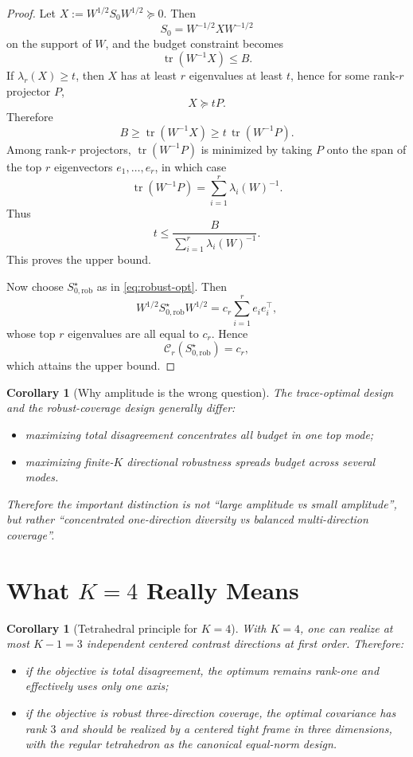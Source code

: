\documentclass[11pt]{article}
\newcommand{\tr}{\operatorname{tr}}
\newtheorem{corollary}[theorem]{Corollary}
\theoremstyle{remark}
\begin{document}
\begin{proof}
Let $X:=W^{1/2}S_0W^{1/2}\succeq 0$. Then
\[
S_0 = W^{-1/2}XW^{-1/2}
\]
on the support of $W$, and the budget constraint becomes
\[
\tr(W^{-1}X)\le B.
\]
If $\lambda_r(X)\ge t$, then $X$ has at least $r$ eigenvalues at least $t$, hence for some rank-$r$ projector $P$,
\[
X \succeq tP.
\]
Therefore
\[
B\ge \tr(W^{-1}X)\ge t\,\tr(W^{-1}P).
\]
Among rank-$r$ projectors, $\tr(W^{-1}P)$ is minimized by taking $P$ onto the span of the top $r$ eigenvectors $e_1,\dots,e_r$, in which case
\[
\tr(W^{-1}P)=\sum_{i=1}^r \lambda_i(W)^{-1}.
\]
Thus
\[
t\le \frac{B}{\sum_{i=1}^r \lambda_i(W)^{-1}}.
\]
This proves the upper bound.

Now choose $S_{0,\mathrm{rob}}^\star$ as in \eqref{eq:robust-opt}. Then
\[
W^{1/2}S_{0,\mathrm{rob}}^\star W^{1/2}
=
c_r \sum_{i=1}^r e_i e_i^\top,
\]
whose top $r$ eigenvalues are all equal to $c_r$. Hence
\[
\mathcal C_r(S_{0,\mathrm{rob}}^\star)=c_r,
\]
which attains the upper bound.
\end{proof}

\begin{corollary}[Why amplitude is the wrong question]
\label{cor:wrong-question}
The trace-optimal design and the robust-coverage design generally differ:
\begin{itemize}
\item maximizing total disagreement concentrates all budget in one top mode;
\item maximizing finite-$K$ directional robustness spreads budget across several modes.
\end{itemize}
Therefore the important distinction is not ``large amplitude vs small amplitude'', but rather ``concentrated one-direction diversity vs balanced multi-direction coverage''.
\end{corollary}

\section{What \texorpdfstring{$K=4$}{K=4} Really Means}

\begin{corollary}[Tetrahedral principle for $K=4$]
\label{cor:tetrahedral}
With $K=4$, one can realize at most $K-1=3$ independent centered contrast directions at first order. Therefore:
\begin{itemize}
\item if the objective is total disagreement, the optimum remains rank-one and effectively uses only one axis;
\item if the objective is robust three-direction coverage, the optimal covariance has rank $3$ and should be realized by a centered tight frame in three dimensions, with the regular tetrahedron as the canonical equal-norm design.
\end{itemize}
\end{corollary}
\end{document}
